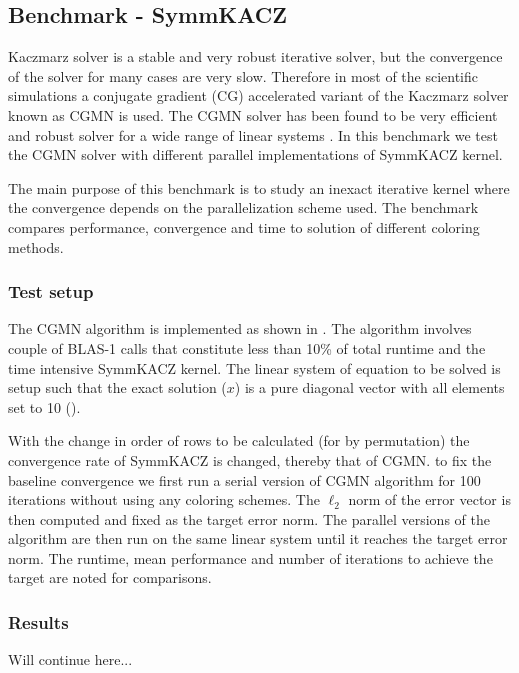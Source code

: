 \subsection{Benchmark - \acrshort{SymmKACZ}}
Kaczmarz solver is a stable and very robust iterative solver, but the convergence of the solver for many cases are very slow. Therefore in most of the scientific simulations a conjugate gradient (CG) accelerated variant of the Kaczmarz solver known as CGMN \cite{CGMN} is used. The CGMN solver has been found to be very efficient and robust solver for a wide range of linear systems \cite{CGMN_gordon}. In this benchmark we test the CGMN solver with different parallel implementations of \acrshort{SymmKACZ} kernel. 

The main purpose of this benchmark is to study an inexact iterative kernel where the convergence depends on the parallelization scheme used. The benchmark compares performance, convergence and time to solution of different coloring methods.

\subsubsection{Test setup}
The CGMN algorithm is implemented as shown in \cite{CGMN_gordon}. The algorithm involves couple of BLAS-1 calls that constitute less than 10\% of total runtime and the time intensive \acrshort{SymmKACZ} kernel. The linear system of equation to be solved is setup such that the exact solution ($x$) is a pure diagonal vector with all elements set to 10 (\ie [10,10,10,...]).

With the change in order of rows to be calculated (for \eg by permutation) the convergence rate of \acrshort{SymmKACZ} is changed, thereby that of CGMN. \Inorder to fix the baseline convergence we first run a serial version of CGMN algorithm for 100 iterations without using any coloring schemes. The $\ell_2$ norm of the error vector is then computed and fixed as the target error  norm. The parallel versions of the algorithm are then run on the same linear system until it reaches the target error norm. The runtime, mean performance and number of iterations to achieve the target are noted for comparisons.


\subsubsection{Results}

{\GW Will continue here...}


